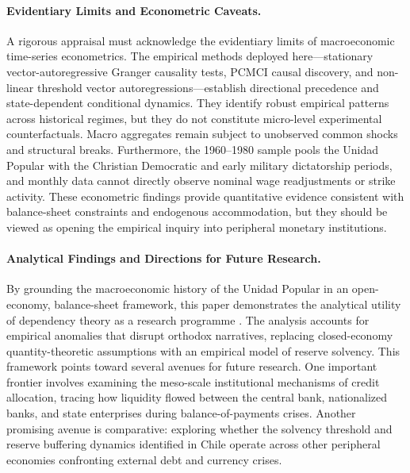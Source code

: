 \paragraph{Evidentiary Limits and Econometric Caveats.}
A rigorous appraisal must acknowledge the evidentiary limits of macroeconomic time-series econometrics. The empirical methods deployed here---stationary vector-autoregressive Granger causality tests, PCMCI causal discovery, and non-linear threshold vector autoregressions---establish directional precedence and state-dependent conditional dynamics. They identify robust empirical patterns across historical regimes, but they do not constitute micro-level experimental counterfactuals. Macro aggregates remain subject to unobserved common shocks and structural breaks. Furthermore, the 1960--1980 sample pools the Unidad Popular with the Christian Democratic and early military dictatorship periods, and monthly data cannot directly observe nominal wage readjustments or strike activity. These econometric findings provide quantitative evidence consistent with balance-sheet constraints and endogenous accommodation, but they should be viewed as opening the empirical inquiry into peripheral monetary institutions.

\paragraph{Analytical Findings and Directions for Future Research.}
By grounding the macroeconomic history of the Unidad Popular in an open-economy, balance-sheet framework, this paper demonstrates the analytical utility of dependency theory as a research programme \citep{Kvangraven2021}. The analysis accounts for empirical anomalies that disrupt orthodox narratives, replacing closed-economy quantity-theoretic assumptions with an empirical model of reserve solvency. This framework points toward several avenues for future research. One important frontier involves examining the meso-scale institutional mechanisms of credit allocation, tracing how liquidity flowed between the central bank, nationalized banks, and state enterprises during balance-of-payments crises. Another promising avenue is comparative: exploring whether the solvency threshold and reserve buffering dynamics identified in Chile operate across other peripheral economies confronting external debt and currency crises.

